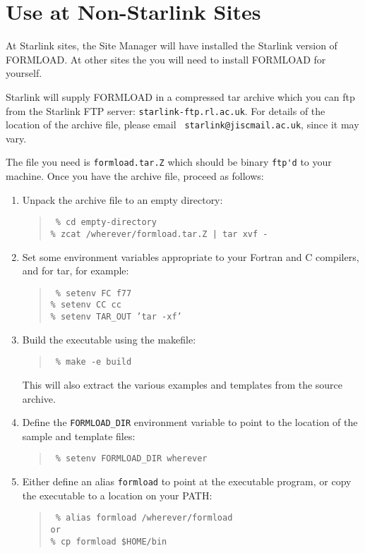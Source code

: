\section{Use at Non-Starlink Sites}

At Starlink sites, the Site Manager will have installed the Starlink
version of FORMLOAD.  At other sites the you will need to install
FORMLOAD for yourself.

Starlink will supply FORMLOAD in a compressed tar archive which you can
ftp from the Starlink FTP server: {\tt starlink-ftp.rl.ac.uk}. For
details of the location of the archive file, please email {\tt
starlink@jiscmail.ac.uk}, since it may vary.

The file you need is \verb|formload.tar.Z| which should be binary
\verb|ftp'd| to your machine.  Once you have the archive file, proceed as
follows:

\begin{enumerate}

\item  Unpack the archive file to an empty directory:
\begin{quote}\tt
\% cd empty-directory\\
\% zcat /wherever/formload.tar.Z | tar xvf -
\end{quote}

\item  Set some environment variables appropriate to your Fortran and C
compilers, and for tar, for example:

\begin{quote}\tt
\% setenv FC f77 \\
\% setenv CC cc \\
\% setenv TAR\_OUT 'tar -xf'
\end{quote}

\item  Build the executable using the makefile:
\begin{quote}\tt
\% make -e build
\end{quote}
This will also extract the various examples and templates from the source
archive.

\item  Define the {\tt FORMLOAD\_DIR} environment variable to point to the
location of the sample and template files:
\begin{quote}\tt
\% setenv FORMLOAD\_DIR wherever
\end{quote}

\item  Either define an alias \verb|formload| to point at the executable
program, or copy the executable to a location on your PATH:
\begin{quote}\tt
\% alias formload /wherever/formload \\
{\rm or} \\
\% cp formload \$HOME/bin
\end{quote}

\end{enumerate}

